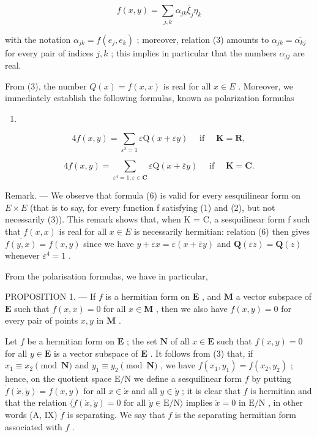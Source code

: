\[
f (x, y) = \sum_ {j, k} \alpha_ {j k} \overline {{{{\xi}}}} _ {j} \eta_ {k}
\]

with the notation \(\alpha_{jk} = f(e_j, e_k)\) ; moreover, relation (3) amounts to \(\alpha_{jk} = \overline{\alpha_{kj}}\) for every pair of indices \(j, k\) ; this implies in particular that the numbers \(\alpha_{jj}\) are real.

From (3), the number \(Q(x) = f(x, x)\) is real for all \(x \in E\) . Moreover, we immediately establish the following formulas, known as polarization formulas

\begin{enumerate}
\def\labelenumi{(\arabic{enumi})}
\setcounter{enumi}{4}
\tightlist
\item
\end{enumerate}

\[
4 f (x, y) = \sum_ {\varepsilon^ {2} = 1} \varepsilon \mathrm{Q} (x + \varepsilon y) \quad \text { if } \quad \mathbf {K} = \mathbf {R},\tag{6}
\]

\[
4 f (x, y) = \sum_ {\varepsilon^ {4} = 1, \varepsilon \in \mathbf {C}} \varepsilon \mathrm{Q} (x + \overline {{{\varepsilon}}} y) \quad \text { if } \quad \mathbf {K} = \mathbf {C}.
\]

Remark. --- We observe that formula (6) is valid for every sesquilinear form on \(E \times E\) (that is to say, for every function f satisfying (1) and (2), but not necessarily (3)). This remark shows that, when K = C, a sesquilinear form f such that \(f(x, x)\) is real for all \(x \in E\) is necessarily hermitian: relation (6) then gives \(\overline{f(y, x)} = f(x, y)\) since we have \(y + \varepsilon x = \varepsilon(x + \overline{\varepsilon}y)\) and \(\mathbf{Q}(\varepsilon z) = \mathbf{Q}(z)\) whenever \(\varepsilon^{4} = 1\) .

From the polarisation formulas, we have in particular,

PROPOSITION 1. --- If \(f\) is a hermitian form on \(\mathbf{E}\) , and \(\mathbf{M}\) a vector subspace of \(\mathbf{E}\) such that \(f(x, x) = 0\) for all \(x \in \mathbf{M}\) , then we also have \(f(x, y) = 0\) for every pair of points \(x, y\) in \(\mathbf{M}\) .

Let \(f\) be a hermitian form on \(\mathbf{E}\) ; the set \(\mathbf{N}\) of all \(x \in \mathbf{E}\) such that \(f(x, y) = 0\) for all \(y \in \mathbf{E}\) is a vector subspace of \(\mathbf{E}\) . It follows from (3) that, if \(x_1 \equiv x_2 \pmod{\mathbf{N}}\) and \(y_1 \equiv y_2 \pmod{\mathbf{N}}\) , we have \(f(x_1, y_1) = f(x_2, y_2)\) ; hence, on the quotient space \(\mathrm{E/N}\) we define a sesquilinear form \(f\) by putting \(\dot{f}(\dot{x}, \dot{y}) = f(x, y)\) for all \(x \in \dot{x}\) and all \(y \in \dot{y}\) ; it is clear that \(\dot{f}\) is hermitian and that the relation \(\langle \dot{f}(\dot{x}, \dot{y}) = 0 \text{ for all } \dot{y} \in \mathrm{E/N} \rangle\) implies \(\dot{x} = 0 \text{ in } \mathrm{E/N}\) , in other words (A, IX) \(\dot{f}\) is separating. We say that \(f\) is the separating hermitian form associated with \(f\) .


